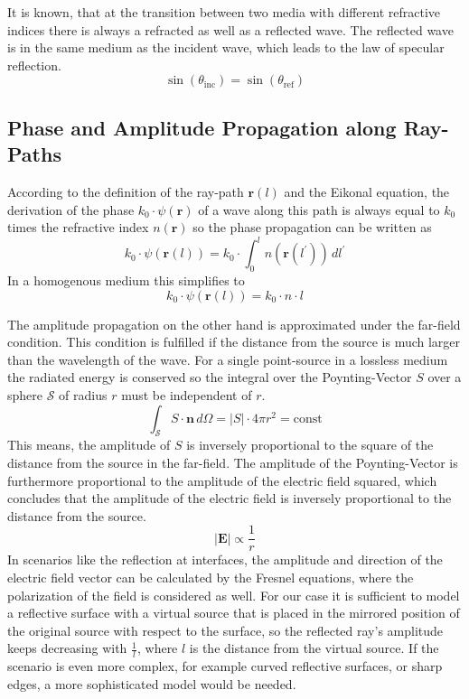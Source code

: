 It is known, that at the transition between two media with different refractive indices there is always a refracted as well as a reflected wave.
The reflected wave is in the same medium as the incident wave, which leads to the law of specular reflection.
\begin{equation}
    \sin(\theta_{\text{inc}}) = \sin(\theta_{\text{ref}})
\end{equation}


\subsection{Phase and Amplitude Propagation along Ray-Paths}
According to the definition of the ray-path \(\bm{r}(l)\) and the Eikonal equation, the derivation of the phase \(k_0 \cdot \psi(\bm{r})\) of a wave along this path is always equal to \(k_0\) times the refractive index \(n(\bm{r})\) so the phase propagation can be written as
\begin{equation}
    k_0 \cdot \psi(\bm{r}(l)) = k_0 \cdot \int_{0}^{l} n(\bm{r}(l^{\prime})) \, dl^{\prime}
\end{equation}
In a homogenous medium this simplifies to
\begin{equation}
    k_0 \cdot \psi(\bm{r}(l)) = k_0 \cdot n \cdot l
\end{equation}

The amplitude propagation on the other hand is approximated under the far-field condition.
This condition is fulfilled if the distance from the source is much larger than the wavelength of the wave.
For a single point-source in a lossless medium the radiated energy is conserved so the integral over the Poynting-Vector \(S\) over a sphere \(\mathcal{S} \) of radius \(r\) must be independent of \(r\).
\begin{equation}
    \int_\mathcal{S}  S \cdot \bm{n} \, d\Omega = |S| \cdot 4\pi r^2 = \text{const}
\end{equation}
This means, the amplitude of \(S\) is inversely proportional to the square of the distance from the source in the far-field.
The amplitude of the Poynting-Vector is furthermore proportional to the amplitude of the electric field squared, which concludes that the amplitude of the electric field is inversely proportional to the distance from the source.
\begin{equation}
    |\bm{E}| \propto \frac{1}{r}
\end{equation}
In scenarios like the reflection at interfaces, the amplitude and direction of the electric field vector can be calculated by the Fresnel equations, where the polarization of the field is considered as well.
For our case it is sufficient to model a reflective surface with a virtual source that is placed in the mirrored position of the original source with respect to the surface, so the reflected ray's amplitude keeps decreasing with \(\frac{1}{l}\), where \(l\) is the distance from the virtual source.
If the scenario is even more complex, for example curved reflective surfaces, or sharp edges, a more sophisticated model would be needed.

